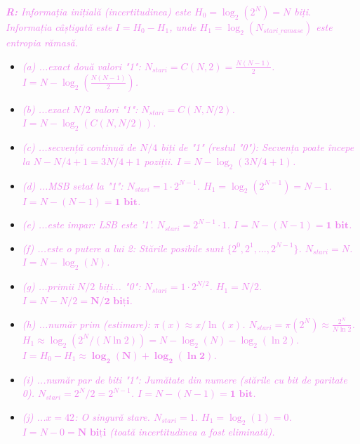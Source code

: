 \documentclass[a4paper]{article}
\newcommand{\hl}[1]{\textcolor{violet}{\textit{#1}}}
\newenvironment{definition}[1]
    {\begin{definitionbox}[frametitle={#1}]}
    {\end{definitionbox}}
\begin{document}
\begin{definition}{}
\hl{\textbf{R:} Informația inițială (incertitudinea) este $H_0 = \log_2(2^N) = N$ biți. Informația câștigată este $I = H_0 - H_1$, unde $H_1 = \log_2(N_{stari\_ramase})$ este entropia rămasă.}
\begin{itemize}
    \item \hl{(a) ...exact două valori "1": $N_{stari} = C(N, 2) = \frac{N(N-1)}{2}$. $I = N - \log_2(\frac{N(N-1)}{2})$.}
    \item \hl{(b) ...exact $N/2$ valori "1": $N_{stari} = C(N, N/2)$. $I = N - \log_2(C(N, N/2))$.}
    \item \hl{(c) ...secvență continuă de $N/4$ biți de "1" (restul "0"): Secvența poate începe la $N - N/4 + 1 = 3N/4 + 1$ poziții. $I = N - \log_2(3N/4 + 1)$.}
    \item \hl{(d) ...MSB setat la "1": $N_{stari} = 1 \cdot 2^{N-1}$. $H_1 = \log_2(2^{N-1}) = N-1$. $I = N - (N-1) = \mathbf{1 \text{ bit}}$.}
    \item \hl{(e) ...este impar: LSB este '1'. $N_{stari} = 2^{N-1} \cdot 1$. $I = N - (N-1) = \mathbf{1 \text{ bit}}$.}
    \item \hl{(f) ...este o putere a lui 2: Stările posibile sunt $\{2^0, 2^1, ..., 2^{N-1}\}$. $N_{stari} = N$. $I = N - \log_2(N)$.}
    \item \hl{(g) ...primii $N/2$ biți... "0": $N_{stari} = 1 \cdot 2^{N/2}$. $H_1 = N/2$. $I = N - N/2 = \mathbf{N/2 \text{ biți}}$.}
    \item \hl{(h) ...număr prim (estimare): $\pi(x) \approx x / \ln(x)$. $N_{stari} = \pi(2^N) \approx \frac{2^N}{N \ln 2}$. $H_1 \approx \log_2(2^N / (N \ln 2)) = N - \log_2(N) - \log_2(\ln 2)$. $I = H_0 - H_1 \approx \mathbf{\log_2(N) + \log_2(\ln 2)}$.}
    \item \hl{(i) ...număr par de biti "1": Jumătate din numere (stările cu bit de paritate 0). $N_{stari} = 2^N / 2 = 2^{N-1}$. $I = N - (N-1) = \mathbf{1 \text{ bit}}$.}
    \item \hl{(j) ...$x=42$: O singură stare. $N_{stari} = 1$. $H_1 = \log_2(1) = 0$. $I = N - 0 = \mathbf{N \text{ biți}}$ (toată incertitudinea a fost eliminată).}
\end{itemize}
\end{definition}
\end{document}
